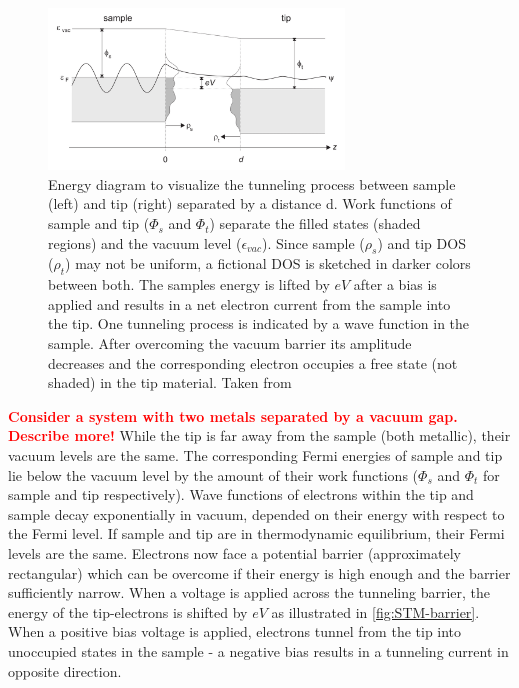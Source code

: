\begin{figure}[]\centering
	\includegraphics[width=0.7\textwidth]{./images/tunnel-barrier}
	\caption{Energy diagram to visualize the tunneling process between sample (left) and tip (right) separated by a distance d. Work functions of sample and tip ($\Phi_s$ and $\Phi_t$) separate the filled states (shaded regions) and the vacuum level ($\epsilon_{vac}$). Since sample ($\rho_s$) and tip DOS ($\rho_t$) may not be uniform, a fictional DOS is sketched in darker colors between both. The samples energy is lifted by $eV$ after a bias is applied and results in a net electron current from the sample into the tip. One tunneling process is indicated by a wave function in the sample. After overcoming the vacuum barrier its amplitude decreases and the corresponding electron occupies a free state (not shaded) in the tip material.  Taken from \cite{diss-schunack}}
	\label{fig:STM-barrier}
\end{figure}

\textcolor{red}{\textbf{Consider a system with two metals separated by a vacuum gap. Describe more!}}
While the tip is far away from the sample (both metallic), their vacuum levels are the same. The corresponding Fermi energies of sample and tip lie below the vacuum level by the amount of their work functions ($\Phi_s$ and $\Phi_t$ for sample and tip respectively). Wave functions of electrons within the tip and sample decay exponentially in vacuum, depended on their energy with respect to the Fermi level.
If sample and tip are in thermodynamic equilibrium, their Fermi levels are the same. Electrons now face a potential barrier (approximately rectangular) which can be overcome if their energy is high enough and the barrier sufficiently narrow. When a voltage is applied across the tunneling barrier, the energy of the tip-electrons is shifted by $eV$ as illustrated in \autoref{fig:STM-barrier}. When a positive bias voltage is applied, electrons tunnel from the tip into unoccupied states in the sample - a negative bias results in a tunneling current in opposite direction. 

